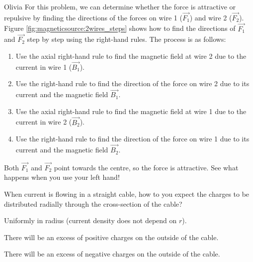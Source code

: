 \begin{studentOpinion}{Olivia}
For this problem, we can determine whether the force is attractive or repulsive by finding the directions of  the forces on wire 1 ($\vec{F_1}$) and wire 2 ($\vec{F_2}$). Figure \ref{fig:magneticsource:2wires_steps} shows how to find the directions of $\vec{F_1}$ and $\vec{F_2}$ step by step using the right-hand rules. The process is as follows: 
\begin{enumerate}[label=(\alph*)]
\item Use the axial right-hand rule to find the magnetic field at wire 2 due to the current in wire 1 ($\vec{B_1}$).
\item Use the right-hand rule to find the direction of the force on wire 2 due to its current and the magnetic field $\vec{B_1}$. 
\item Use the axial right-hand rule to find the magnetic field at wire 1 due to the current in wire 2 ($\vec{B_2}$).
\item Use the right-hand rule to find the direction of the force on wire 1 due to its current and the magnetic field $\vec{B_2}$. 
\end{enumerate}
Both $\vec{F_1}$ and $\vec{F_2}$ point towards the centre, so the force is attractive. See what happens when you use your left hand!
\end{studentOpinion}

\begin{checkpoint}{}
	\begin{MCquestion}{When current is flowing in a straight cable, how to you expect the charges to be distributed radially through the cross-section of the cable?}
		\item Uniformly in radius (current density does not depend on $r$).
		\item There will be an excess of positive charges on the outside of the cable. \correct
		\item There will be an excess of negative charges on the outside of the cable.
	\end{MCquestion}
\end{checkpoint}
